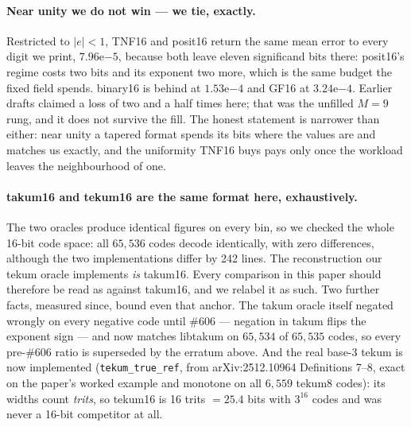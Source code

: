 \paragraph{Near unity we do not win --- we tie, exactly.} Restricted to
$|e|<1$, TNF16 and posit16 return the same mean error to every digit we print,
$7.96\mathrm{e}{-5}$, because both leave eleven significand bits there: posit16's
regime costs two bits and its exponent two more, which is the same budget the
fixed field spends. binary16 is behind at $1.53\mathrm{e}{-4}$ and GF16 at
$3.24\mathrm{e}{-4}$. Earlier drafts claimed a loss of two and a half times here;
that was the unfilled $M{=}9$ rung, and it does not survive the fill. The honest
statement is narrower than either: near unity a tapered format spends its bits
where the values are and matches us exactly, and the uniformity TNF16 buys pays
only once the workload leaves the neighbourhood of one.

\paragraph{takum16 and tekum16 are the same format here, exhaustively.} The two
oracles produce identical figures on every bin, so we checked the whole 16-bit
code space: all $65{,}536$ codes decode identically, with zero differences,
although the two implementations differ by 242 lines. The reconstruction our
tekum oracle implements \emph{is} takum16. Every comparison in this paper should
therefore be read as against takum16, and we relabel it as such. Two further
facts, measured since, bound even that anchor. The takum oracle itself negated
wrongly on every negative code until \#606 --- negation in takum flips the
exponent sign --- and now matches libtakum on $65{,}534$ of $65{,}535$ codes,
so every pre-\#606 ratio is superseded by the erratum above. And the real
base-3 tekum is now implemented (\texttt{tekum\_true\_ref}, from
arXiv:2512.10964 Definitions 7--8, exact on the paper's worked example and
monotone on all $6{,}559$ tekum8 codes): its widths count \emph{trits}, so
tekum16 is 16 trits $= 25.4$ bits with $3^{16}$ codes and was never a 16-bit
competitor at all.



